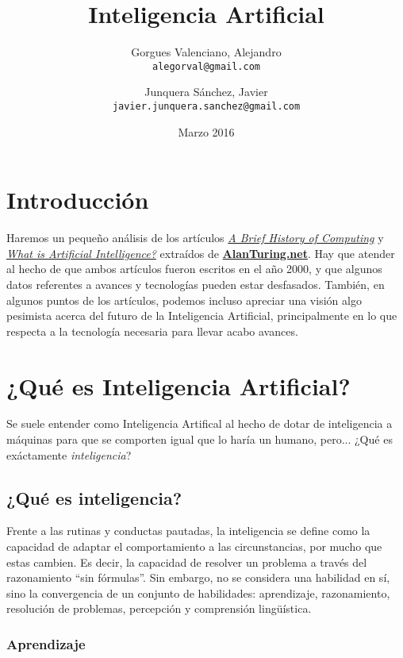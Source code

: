 \documentclass[a4paper]{article}
\title{Inteligencia Artificial}
\author{Gorgues Valenciano, Alejandro\\
        \texttt{alegorval@gmail.com}
        \and
        Junquera Sánchez, Javier\\
        \texttt{javier.junquera.sanchez@gmail.com}
}
\date{Marzo 2016}
\begin{document}
    \maketitle

    \section*{Introducción}

    Haremos un pequeño análisis de los artículos \href{http://www.alanturing.net/turing_archive/pages/Reference%20Articles/BriefHistofComp.html}{\emph{A Brief History of Computing}}\cite{ABHOC} y \href{http://www.alanturing.net/turing_archive/pages/Reference%20Articles/What%20is%20AI.html}{\emph{What is Artificial Intelligence?}}\cite{WIAI} extraídos de \href{http://www.alanturing.net}{\textbf{AlanTuring.net}}. Hay que atender al hecho de que ambos artículos fueron escritos en el año 2000, y que algunos datos referentes a avances y tecnologías pueden estar desfasados. También, en algunos puntos de los artículos, podemos incluso apreciar una visión algo pesimista acerca del futuro de la Inteligencia Artificial, principalmente en lo que respecta a la tecnología necesaria para llevar acabo avances.

    \section*{¿Qué es Inteligencia Artificial?}

    Se suele entender como Inteligencia Artifical al hecho de dotar de inteligencia a máquinas para que se comporten igual que lo haría un humano, pero... ¿Qué es exáctamente \emph{inteligencia}?

    \subsection*{¿Qué es inteligencia?}

    Frente a las rutinas y conductas pautadas, la inteligencia se define como la capacidad de adaptar el comportamiento a las circunstancias, por mucho que estas cambien. Es decir, la capacidad de resolver un problema a través del razonamiento “sin fórmulas”. Sin embargo, no se considera una habilidad en sí, sino la convergencia de un conjunto de habilidades: aprendizaje, razonamiento, resolución de problemas, percepción y comprensión lingüística.

    \subsubsection*{Aprendizaje}
\end{document}
